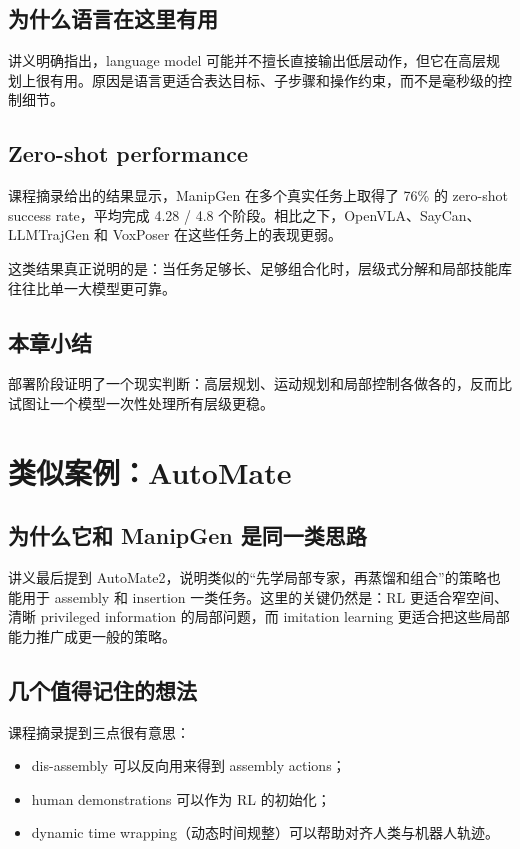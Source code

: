 \documentclass[a4paper]{article}
\begin{document}
\subsection{为什么语言在这里有用}

讲义明确指出，language model 可能并不擅长直接输出低层动作，但它在高层规划上很有用。原因是语言更适合表达目标、子步骤和操作约束，而不是毫秒级的控制细节。

\subsection{Zero-shot performance}

课程摘录给出的结果显示，ManipGen 在多个真实任务上取得了 76\% 的 zero-shot success rate，平均完成 4.28 / 4.8 个阶段。相比之下，OpenVLA、SayCan、LLMTrajGen 和 VoxPoser 在这些任务上的表现更弱。

这类结果真正说明的是：当任务足够长、足够组合化时，层级式分解和局部技能库往往比单一大模型更可靠。

\subsection{本章小结}

部署阶段证明了一个现实判断：高层规划、运动规划和局部控制各做各的，反而比试图让一个模型一次性处理所有层级更稳。

\section{类似案例：AutoMate}

\subsection{为什么它和 ManipGen 是同一类思路}

讲义最后提到 AutoMate2，说明类似的“先学局部专家，再蒸馏和组合”的策略也能用于 assembly 和 insertion 一类任务。这里的关键仍然是：RL 更适合窄空间、清晰 privileged information 的局部问题，而 imitation learning 更适合把这些局部能力推广成更一般的策略。

\subsection{几个值得记住的想法}

课程摘录提到三点很有意思：
\begin{itemize}
  \item dis-assembly 可以反向用来得到 assembly actions；
  \item human demonstrations 可以作为 RL 的初始化；
  \item dynamic time wrapping（动态时间规整）可以帮助对齐人类与机器人轨迹。
\end{itemize}
\end{document}
